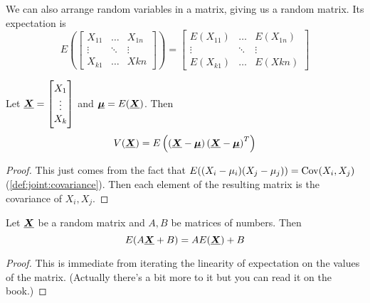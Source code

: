 \documentclass[14pt]{extarticle}
\newcommand{\cov}{{\operatorfont Cov}}
\renewcommand{\vec}[1]{\uvec{#1}}
\begin{document}
We can also arrange random variables in a matrix, giving us a random matrix.
Its expectation is
\begin{equation}
    E\left(\begin{bmatrix}
        X_{11} & \dots  & X_{1n} \\
        \vdots & \ddots & \vdots \\
        X_{k1} & \dots  & X{kn}
    \end{bmatrix}\right) =
    \begin{bmatrix}
        E(X_{11}) & \dots  & E(X_{1n}) \\
        \vdots    & \ddots & \vdots    \\
        E(X_{k1}) & \dots  & E(X{kn})
    \end{bmatrix}
\end{equation}

\begin{proposition}
    \label{prop:gen:variance_mat}
    Let $\vec X =
        \begin{bmatrix}
            X_1    \\
            \vdots \\
            X_k
        \end{bmatrix}$ and $\vec \mu = E(\vec X)$.
    Then
    \begin{equation}
        V(\vec X) = E \left( \left(\vec X - \vec \mu\right) \left(\vec X - \vec \mu\right)^T \right)
    \end{equation}
\end{proposition}

\begin{proof}
    This just comes from the fact that $E((X_i - \mu_i)(X_j - \mu_j)) = \cov(X_i, X_j)$ (\autoref{def:joint:covariance}).
    Then each element of the resulting matrix is the covariance of $X_i, X_j$.
\end{proof}

\begin{theorem}
    Let $\vec X$ be a random matrix and $A, B$ be matrices of numbers.
    Then
    \begin{equation}
        E(A \vec X + B) = A E(\vec X) + B
    \end{equation}
\end{theorem}
\begin{proof}
    This is immediate from iterating the linearity of expectation on the values of the matrix.
    (Actually there's a bit more to it but you can read it on the book.)
\end{proof}
\end{document}
